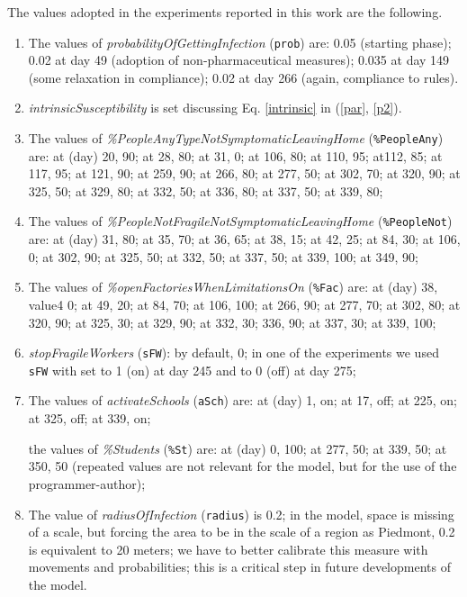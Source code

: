\documentclass[graybox]{svmult}
\begin{document}
The values adopted in the experiments reported in this work are the following.

\begin{enumerate}[label=\roman*]

\item \label{pp1} The values of \emph{probabilityOfGettingInfection} (\verb|prob|) are: 0.05 (starting phase); 0.02 at day 49 (adoption of non-pharmaceutical measures); 0.035 at day 149 (some relaxation in compliance); 0.02 at day 266 (again, compliance to rules). 

\item \label{pp2} \emph{intrinsicSusceptibility} is set discussing Eq. \ref{intrinsic} in (\ref{par}, \ref{p2}).

\item \label{pp3} The values of \emph{\%PeopleAnyTypeNotSymptomaticLeavingHome} (\verb|%PeopleAny|) are:
at (day) 20, 90; at 28, 80; at 31, 0; at 106, 80; at 110, 95; at112, 85; at 117, 95; at 121, 90; at 259, 90; at 266, 80; at 277, 50;
at 302, 70; at 320, 90; at 325, 50; at 329, 80; at 332, 50; at 336, 80; at 337, 50; at 339, 80; 

\item \label{pp4} The values of \emph{\%PeopleNotFragileNotSymptomaticLeavingHome} (\verb|%PeopleNot|) are:
at (day) 31, 80; at 35, 70; at 36, 65; at 38, 15; at 42, 25; at 84, 30; at 106, 0; at 302, 90; at 325, 50; at 332, 50; 
at 337, 50; at 339, 100; at 349, 90;

\item \label{pp5} The values of \emph{\%openFactoriesWhenLimitationsOn} (\verb|%Fac|) are:
at (day) 38, value4 0; at 49, 20; at 84, 70; at 106, 100; at 266, 90; at 277, 70; at 302, 80; at 320, 90; at 325, 30;
at 329, 90; at 332, 30; 336, 90; at 337, 30; at 339, 100;

\item \label{pp6} \emph{stopFragileWorkers} (\verb|sFW|): by default, 0; in one of the experiments we used \verb|sFW| with set to 1 (on) at day 245 and to 0 (off) at day 275;

\item \label{pp7} The values of \emph{activateSchools} (\verb|aSch|) are:
at (day) 1, on; at 17, off; at 225, on; at 325, off; at 339, on; 

the values of \emph{\%Students} (\verb|%St|) are: 
at (day) 0, 100; at 277, 50; at 339, 50; at 350, 50 (repeated values are not relevant for the model, but for the use of the programmer-author);

\item \label{pp8} The value of \emph{radiusOfInfection} (\verb|radius|) is 0.2; in the model, space is missing of a scale, but forcing the area to be in the scale of a region as Piedmont, 0.2 is equivalent to 20 meters; we have to better calibrate this measure with movements and probabilities; this is a critical step in future developments of the model.

\end{enumerate}
\end{document}
